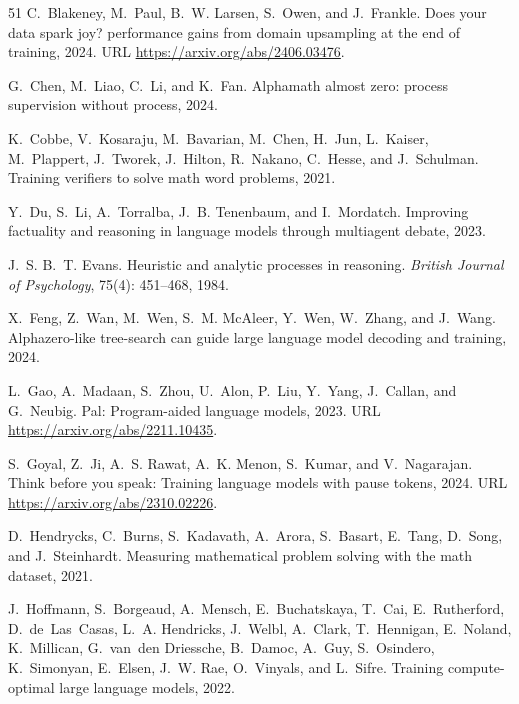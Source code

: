\begin{thebibliography}{51}
C.~Blakeney, M.~Paul, B.~W. Larsen, S.~Owen, and J.~Frankle.
\newblock Does your data spark joy? performance gains from domain upsampling at the end of training, 2024.
\newblock URL \url{https://arxiv.org/abs/2406.03476}.

G.~Chen, M.~Liao, C.~Li, and K.~Fan.
\newblock Alphamath almost zero: process supervision without process, 2024.

K.~Cobbe, V.~Kosaraju, M.~Bavarian, M.~Chen, H.~Jun, L.~Kaiser, M.~Plappert, J.~Tworek, J.~Hilton, R.~Nakano, C.~Hesse, and J.~Schulman.
\newblock Training verifiers to solve math word problems, 2021.

Y.~Du, S.~Li, A.~Torralba, J.~B. Tenenbaum, and I.~Mordatch.
\newblock Improving factuality and reasoning in language models through multiagent debate, 2023.

J.~S. B.~T. Evans.
\newblock Heuristic and analytic processes in reasoning.
\newblock \emph{British Journal of Psychology}, 75(4): 451--468, 1984.

X.~Feng, Z.~Wan, M.~Wen, S.~M. McAleer, Y.~Wen, W.~Zhang, and J.~Wang.
\newblock Alphazero-like tree-search can guide large language model decoding and training, 2024.

L.~Gao, A.~Madaan, S.~Zhou, U.~Alon, P.~Liu, Y.~Yang, J.~Callan, and G.~Neubig.
\newblock Pal: Program-aided language models, 2023.
\newblock URL \url{https://arxiv.org/abs/2211.10435}.

S.~Goyal, Z.~Ji, A.~S. Rawat, A.~K. Menon, S.~Kumar, and V.~Nagarajan.
\newblock Think before you speak: Training language models with pause tokens, 2024.
\newblock URL \url{https://arxiv.org/abs/2310.02226}.

D.~Hendrycks, C.~Burns, S.~Kadavath, A.~Arora, S.~Basart, E.~Tang, D.~Song, and J.~Steinhardt.
\newblock Measuring mathematical problem solving with the math dataset, 2021.

J.~Hoffmann, S.~Borgeaud, A.~Mensch, E.~Buchatskaya, T.~Cai, E.~Rutherford, D.~de~Las~Casas, L.~A. Hendricks, J.~Welbl, A.~Clark, T.~Hennigan, E.~Noland, K.~Millican, G.~van~den Driessche, B.~Damoc, A.~Guy, S.~Osindero, K.~Simonyan, E.~Elsen, J.~W. Rae, O.~Vinyals, and L.~Sifre.
\newblock Training compute-optimal large language models, 2022.


\end{thebibliography}
